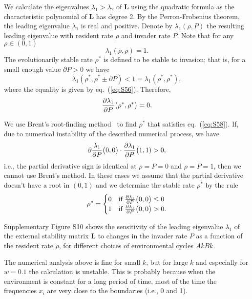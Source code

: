 \documentclass[9pt, a4paper]{extarticle}
\newcommand{\cl}{\mathbf{L}}
\begin{document}
We calculate the eigenvalues $\lambda_1 > \lambda_2$ of $\cl$ using the quadratic formula as the characteristic polynomial of $\cl$ has degree 2.
By the Perron-Frobenius theorem, the leading eigenvalue $\lambda_1$ is real and positive. Denote by $\lambda_1(\rho, P)$ the resulting leading eigenvalue with resident rate $\rho$ and invader rate $P$. Note that for any $\rho \in (0,1)$ 
\begin{equation} \label{eq:S56}
\lambda_1(\rho, \rho) = 1.
\end{equation}
The evolutionarily stable rate $\rho^*$ is defined to be stable to invasion; that is, for a small enough value $\partial P>0$ we have
\begin{equation} 
\lambda_1(\rho^*,\rho^* \pm \partial P) < 1 = \lambda_1(\rho^*,\rho^*),
\end{equation}
where the equality is given by eq.~(\ref{eq:S56}).
Therefore, 
\begin{equation} \label{eq:S58}
{\partial \lambda_1 \over \partial P} \big(\rho^*,\rho^*\big) = 0. 
\end{equation}

We use Brent's root-finding method~\citep{brent1971} to find $\rho^*$ that satisfies eq.~(\ref{eq:S58}).
If, due to numerical instability of the described numerical process, we have
\begin{equation}
\partial {\lambda_1 \over \partial P} \big(0,0\big) \cdot {\partial \lambda_1 \over \partial P} \big(1,1) > 0,
\end{equation}
i.e., the partial derivative sign is identical at $\rho=P=0$ and $\rho=P=1$, then we cannot use Brent's method.
In these cases we assume that the partial derivative doesn't have a root in $(0,1)$ and we determine the stable rate $\rho^*$ by the rule
\begin{equation}
\rho^* = \begin{cases}
0 & \text{if}\ {\partial \lambda_1 \over \partial P} \big(0,0\big) \le 0 \\
1 & \text{if}\ {\partial \lambda_1 \over \partial P} \big(0,0\big) > 0.
\end{cases}
\end{equation}

Supplementary Figure S10 shows the sensitivity of the leading eigenvalue $\lambda_1$ of the external stability matrix $\cl$ to changes in the invader rate $P$ as a function of the resident rate $\rho$, for different choices of environmental cycles $AkBk$.

The  numerical analysis above is fine for small $k$, but for large $k$ and especially for $w=0.1$ the calculation is unstable.
This is probably because when the environment is constant for a long period of time, most of the time the frequencies $x_i$ are very close to the boundaries (i.e., 0 and 1).
\end{document}
